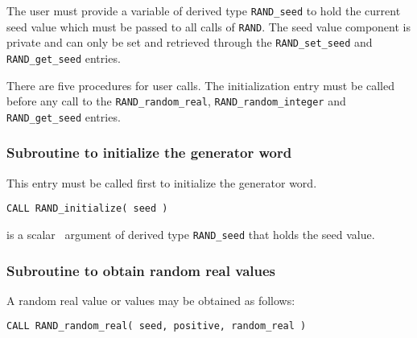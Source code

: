 \documentclass{galahad}
\newcommand{\packagename}{RAND}
\begin{document}




\galtypes
The user must provide a variable of derived type
{\tt \packagename\_seed}
to hold the current seed value which must be passed to all calls of
{\tt \packagename}.
The seed value component is private and can only be set and retrieved
through the
{\tt \packagename\_set\_seed}  and {\tt \packagename\_get\_seed} entries.


\galarguments
There are five procedures for user calls.
The initialization entry must be called before any call to the
{\tt \packagename\_random\_real},
{\tt \packagename\_random\_integer} and
{\tt \packagename\_get\_seed}  entries.


\subsubsection{Subroutine to initialize the generator word}\label{subinit}
This entry must be called first to initialize the generator word.
\vspace*{1mm}

\hskip 0.5in
{\tt CALL \packagename\_initialize( seed )}

\vspace*{-2mm}
\begin{description}
 is a scalar \intentout\ argument of derived type
{\tt \packagename\_seed}
that holds the seed value.
\end{description}


\subsubsection{Subroutine to obtain random real values}
A random real value or values may be obtained as follows:
\vspace*{1mm}

\hskip 0.5in
{\tt CALL \packagename\_random\_real( seed, positive, random\_real )}
\end{document}
